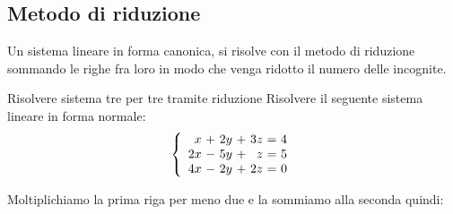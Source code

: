 \subsection{Metodo di riduzione}
\label{sec:Riduzionetre}
Un sistema lineare in forma canonica, si risolve con il metodo di riduzione sommando le righe fra loro in modo che venga ridotto il numero delle incognite.
\begin{esempiot}{Risolvere sistema tre per tre tramite riduzione}{}
	Risolvere il seguente sistema lineare in forma normale:
	\[\left\{
	\begin{array}{*{3}{r@{~}c@{~}}r}
	x & + & 2y &  +&  3z& =&4\\
	2x &- & 5y& + & z & =&5\\
	4x &- & 2y & + & 2z & =&0\\
	\end{array}\right.\]
\end{esempiot}
Moltiplichiamo la prima riga per meno due e la sommiamo alla seconda quindi:
